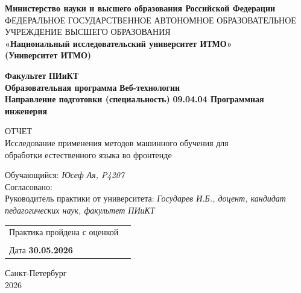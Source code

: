 \thispagestyle{empty}

\begin{center}
\textbf{Министерство науки и высшего образования Российской Федерации}
\\
{\fontsize{9}{10.8}\selectfont
ФЕДЕРАЛЬНОЕ ГОСУДАРСТВЕННОЕ АВТОНОМНОЕ ОБРАЗОВАТЕЛЬНОЕ УЧРЕЖДЕНИЕ ВЫСШЕГО ОБРАЗОВАНИЯ}\\
\textbf{«Национальный исследовательский университет ИТМО»\\
(Университет ИТМО)}\\[1em]
\end{center}

\begin{flushleft}
\textbf{Факультет} \hspace{1em} \textbf{ПИиКТ}\\[0.5em]
\textbf{Образовательная программа} \textbf{Веб-технологии}\\[1em]

\textbf{Направление подготовки (специальность)} \textbf{09.04.04 Программная инженерия}\\[2em]
\end{flushleft}
\begin{center}
{\fontsize{16}{19.2}\selectfont ОТЧЕТ}\\[0.5em]
Исследование применения методов машинного обучения для\\обработки естественного языка во фронтенде\\[5em]
\end{center}

\begin{flushleft}

Обучающийся: \textit{Юсеф Ая, P4207}\\[2em]

Согласовано:\\[0.5em]
Руководитель практики от университета: \textit{Государев И.Б., доцент, кандидат педагогических наук, факультет ПИиКТ}\\[2em]
\end{flushleft}

\begin{flushright}
\begin{tabular}{l l}
Практика пройдена с оценкой & \hspace{1em}\\
\\
Дата \textbf{30.05.2026} & \hspace{1em}
\end{tabular}
\end{flushright}

\vfill

\begin{center}
    Санкт-Петербург\\2026
\end{center}